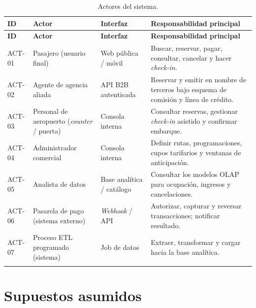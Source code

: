 \documentclass[10pt,letterpaper]{article}
\begin{document}
\begin{longtable}{@{}L{1.8cm} L{3.6cm} L{4.4cm} L{5.4cm}@{}}
\toprule
\textbf{ID} & \textbf{Actor} & \textbf{Interfaz} & \textbf{Responsabilidad principal} \\
\midrule
\endfirsthead
\toprule
\textbf{ID} & \textbf{Actor} & \textbf{Interfaz} & \textbf{Responsabilidad principal} \\
\midrule
\endhead
ACT-01 & Pasajero (usuario final) & Web pública / móvil & Buscar, reservar, pagar, consultar, cancelar y hacer \emph{check-in}. \\
ACT-02 & Agente de agencia aliada & API B2B autenticada & Reservar y emitir en nombre de terceros bajo esquema de comisión y línea de crédito. \\
ACT-03 & Personal de aeropuerto (\emph{counter} / puerta) & Consola interna & Consultar reservas, gestionar \emph{check-in} asistido y confirmar embarque. \\
ACT-04 & Administrador comercial & Consola interna & Definir rutas, programaciones, cupos tarifarios y ventanas de anticipación. \\
ACT-05 & Analista de datos & Base analítica / catálogo & Consultar los modelos OLAP para ocupación, ingresos y cancelaciones. \\
ACT-06 & Pasarela de pago (sistema externo) & \emph{Webhook} / API & Autorizar, capturar y reversar transacciones; notificar resultado. \\
ACT-07 & Proceso ETL programado (sistema) & Job de datos & Extraer, transformar y cargar hacia la base analítica. \\
\bottomrule
\caption{Actores del sistema.}
\end{longtable}

\section{Supuestos asumidos}
\label{sec:supuestos}
\end{document}
